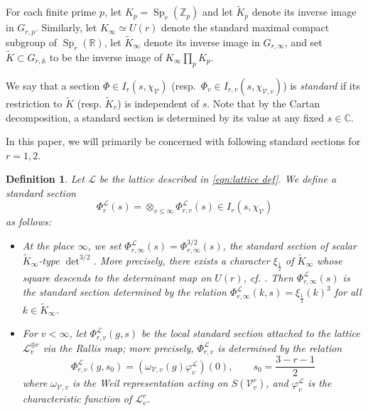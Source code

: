 \documentclass[reqno,oneside]{amsart}
\theoremstyle{plain}
\newtheorem{definition}[theorem]{Definition}
\theoremstyle{remark}
\numberwithin{theorem}{section}
\newcommand{\bbA}{\mathbb A}
\newcommand{\bbC}{\mathbb C}
\newcommand{\bbR}{\mathbb R}
\newcommand{\bbZ}{\mathbb Z}
\newcommand{\calL}{\mathcal L}
\newcommand{\calV}{\mathcal V}
\DeclareMathOperator{\Sp}{Sp}
\begin{document}
	For each finite prime $p$, let  $ K_p  = \Sp_{r}(\bbZ_p)$ and let $\tilde K_p$ denote its inverse image in $ G_{r,p}$. Similarly, let $K_{\infty} \simeq U(r)$ denote the standard maximal compact subgroup of $\Sp_{r}(\bbR)$, let $\tilde K_{\infty}$ denote its inverse image in $G_{r,\infty}$, and set $\tilde K \subset G_{r, {\bbA}} $  to be the inverse image of $K_{\infty} \prod_p K_p$.
	
	We say that a section $\Phi \in I_r(s, \chi_{\calV})$ (resp.\ $\Phi_v \in I_{r,v}(s, \chi_{\calV,v})$) is \emph{standard} if its restriction to $\tilde K$ (resp. $\tilde K_v$) is independent of $s$. Note that by the Cartan decomposition, a standard section is determined by its value at any fixed $s \in \bbC$.
	
	In this paper, we will primarily be concerned with following standard sections for $r=1,2$.
	
	\begin{definition} \label{def:calL global section}Let $\calL$ be the lattice described in \eqref{eqn:lattice def}. We define a standard section
		\begin{equation}
		\Phi_r^{\calL}(s) = \otimes_{v\leq \infty} \Phi^{\calL}_{r,v}(s) \in I_r(s, \chi_{\calV})
		\end{equation}
		as follows:
		\begin{itemize}
			\item 	At the place $\infty$, we set $\Phi^{\calL}_{r,\infty}(s)= \Phi_{r,\infty}^{3/2}(s)$, the standard section of scalar $\tilde K_{\infty}$-type $\det^{3/2}$. More precisely, there exists a character $\xi_{\frac12}$ of $\tilde K_{\infty}$ whose square descends to the determinant map on $U(r)$, cf. \cite[\S 8.5.6]{KRYbook}. Then $\Phi^{\calL}_{r,\infty}(s)$ is the standard section determined by the relation $\Phi^{\calL}_{r,\infty}(k, s) = \xi_{\frac12}(k)^3$ for all $k \in \tilde K_{\infty}$.
			\item  For $v < \infty$,  let $\Phi^{\calL}_{r,v}(g,s)$  be the local standard section attached to the lattice $\calL_{v}^{\oplus r}$ via the Rallis map; more precisely, $\Phi_{r,v}^{\calL}$ is determined by the relation
			\begin{equation}
			\Phi_{r,v}^{\calL}(g,s_0) =  \left( \omega_{\calV,v}(g) \varphi_v^{\calL} \right) (0), \qquad s_0  = \frac{3-r-1}2
			\end{equation}
			where $\omega_{\calV, v}$ is the Weil representation acting on $S(\calV_v^r)$, and $\varphi_v^{\calL}$ is the characteristic function of $\calL_v^r$.
		\end{itemize}	
	\end{definition}
	
\end{document}
